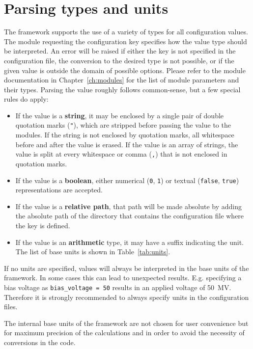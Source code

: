 \section{Parsing types and units}
\label{sec:config_values}
The \corry framework supports the use of a variety of types for all configuration values.
The module requesting the configuration key specifies how the value type should be interpreted.
An error will be raised if either the key is not specified in the configuration file, the conversion to the desired type is not possible, or if the given value is outside the domain of possible options.
Please refer to the module documentation in Chapter~\ref{ch:modules} for the list of module parameters and their types.
Parsing the value roughly follows common-sense, but a few special rules do apply:
\begin{itemize}
\item If the value is a \textbf{string}, it may be enclosed by a single pair of double quotation marks (\texttt{"}), which are stripped before passing the value to the modules.
If the string is not enclosed by quotation marks, all whitespace before and after the value is erased.
If the value is an array of strings, the value is split at every whitespace or comma (\texttt{,}) that is not enclosed in quotation marks.
\item If the value is a \textbf{boolean}, either numerical (\texttt{0}, \texttt{1}) or textual (\texttt{false}, \texttt{true}) representations are accepted.
\item If the value is a \textbf{relative path}, that path will be made absolute by adding the absolute path of the directory that contains the configuration file where the key is defined.
\item If the value is an \textbf{arithmetic} type, it may have a suffix indicating the unit.
The list of base units is shown in Table~\ref{tab:units}.
\end{itemize}

\begin{warning}
  If no units are specified, values will always be interpreted in the base units of the framework.
  In some cases this can lead to unexpected results.
  E.g. specifying a bias voltage as \texttt{bias\_voltage = 50} results in an applied voltage of \SI{50}{\mega\volt}.
  Therefore it is strongly recommended to always specify units in the configuration files.
\end{warning}

The internal base units of the framework are not chosen for user convenience but for maximum precision of the calculations and in order to avoid the necessity of conversions in the code.

